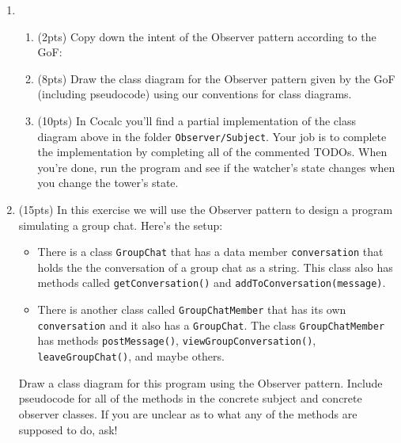 \documentclass[11pt]{article}
\newlength{\up}\setlength{\up}{-\baselineskip}
\begin{document}
\begin{enumerate}

  \item  

  \begin{enumerate}

    \item (2pts) Copy down the intent of the Observer pattern according to the GoF:

    \vspace{1in}

    \item (8pts) Draw the class diagram for the Observer pattern given by the GoF (including pseudocode) using our conventions for class diagrams. 

    \vfill

    \item (10pts) In Cocalc you'll find a partial implementation of the class diagram above in the folder \newline\texttt{Observer/Subject}. Your job is to complete the implementation by completing all of the commented TODOs. When you're done, run the program and see if the watcher's state changes when you change the tower's state.

  \end{enumerate}

\newpage

  \item (15pts) In this exercise we will use the Observer pattern to design a program simulating a group chat. Here's the setup:
    \begin{itemize}
      \item There is a class \texttt{GroupChat} that has a data member \texttt{conversation} that holds the the conversation of a group chat as a string. This class also has methods called \texttt{getConversation()} and \newline
      \texttt{addToConversation(message)}.
      \item There is another class called \texttt{GroupChatMember} that has its own \texttt{conversation} and it also has a \texttt{GroupChat}. The class \texttt{GroupChatMember} has methods \texttt{postMessage()}, \texttt{viewGroupConversation()}, \newline
      \texttt{leaveGroupChat()}, and maybe others.
    \end{itemize}

  Draw a class diagram for this program using the Observer pattern. Include pseudocode for all of the methods in the concrete subject and concrete observer classes. If you are unclear as to what any of the methods are supposed to do, ask!


\end{enumerate}
\end{document}
